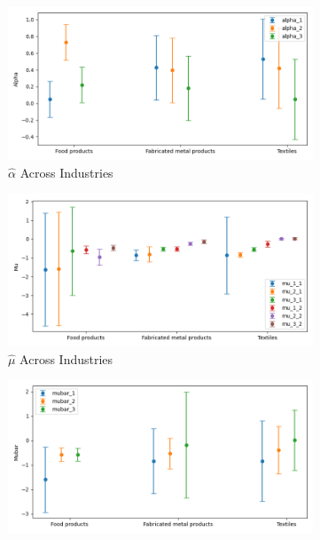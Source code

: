 \documentclass{article}
\begin{document}
\begin{figure}[ht!]
    \centering 
    \caption{AR(1) Mixture Model Across Industries}
    \begin{subfigure}[t]{0.32\textwidth}
        \centering
        \includegraphics[width=\textwidth]{figure/ar1_mixture_alpha_across_industries_m3.png}
        \caption{$\hat\alpha$ Across Industries}
    \end{subfigure}
    \begin{subfigure}[t]{0.32\textwidth}
        \centering
        \includegraphics[width=\textwidth]{figure/ar1_mixture_mu_across_industries_m3.png}
        \caption{$\hat\mu$ Across Industries}
    \end{subfigure}
    \begin{subfigure}[t]{0.32\textwidth}
        \centering
        \includegraphics[width=\textwidth]{figure/ar1_mixture_mubar_across_industries_m3.png}

\end{subfigure}
\end{figure}
\end{document}
